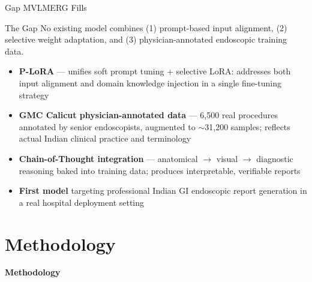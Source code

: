 ﻿\documentclass[aspectratio=169]{beamer}
\begin{document}
\begin{frame}{Gap MVLMERG Fills}
\begin{block}{The Gap}
No existing model combines (1) prompt-based input alignment, (2) selective weight adaptation, and (3) physician-annotated endoscopic training data.
\end{block}
\vspace{0.5em}
\begin{itemize}
    \item \textbf{P-LoRA} --- unifies soft prompt tuning + selective LoRA: addresses both input alignment and domain knowledge injection in a single fine-tuning strategy
    \item \textbf{GMC Calicut physician-annotated data} --- 6,500 real procedures annotated by senior endoscopists, augmented to $\sim$31,200 samples; reflects actual Indian clinical practice and terminology
    \item \textbf{Chain-of-Thought integration} --- anatomical $\to$ visual $\to$ diagnostic reasoning baked into training data; produces interpretable, verifiable reports
    \item \textbf{First model} targeting professional Indian GI endoscopic report generation in a real hospital deployment setting
\end{itemize}
\end{frame}

\section{Methodology}

\begin{frame}
\centering \Large \textbf{Methodology}
\end{frame}
\end{document}
